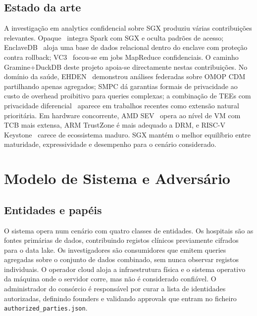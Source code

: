 \subsection{Estado da arte}

A investigação em analytics confidencial sobre SGX produziu várias contribuições relevantes. Opaque~\cite{zheng2017opaque} integra Spark com SGX e oculta padrões de acesso; EnclaveDB~\cite{priebe2018enclavedb} aloja uma base de dados relacional dentro do enclave com proteção contra rollback; VC3~\cite{schuster2015vc3} focou-se em jobs MapReduce confidenciais. O caminho Gramine+DuckDB deste projeto apoia-se directamente nestas contribuições. No domínio da saúde, EHDEN~\cite{ehden} demonstrou análises federadas sobre OMOP CDM partilhando apenas agregados; SMPC dá garantias formais de privacidade ao custo de overhead proibitivo para queries complexas; a combinação de TEEs com privacidade diferencial~\cite{dwork2006differential} aparece em trabalhos recentes como extensão natural prioritária. Em hardware concorrente, AMD SEV~\cite{kaplan2016sev} opera ao nível de VM com TCB mais extensa, ARM TrustZone é mais adequado a DRM, e RISC-V Keystone~\cite{lee2020keystone} carece de ecossistema maduro. SGX mantém o melhor equilíbrio entre maturidade, expressividade e desempenho para o cenário considerado.

\section{Modelo de Sistema e Adversário}

\subsection{Entidades e papéis}

O sistema opera num cenário com quatro classes de entidades. Os hospitais são as fontes primárias de dados, contribuindo registos clínicos previamente cifrados para o data lake. Os investigadores são consumidores que emitem queries agregadas sobre o conjunto de dados combinado, sem nunca observar registos individuais. O operador cloud aloja a infraestrutura física e o sistema operativo da máquina onde o servidor corre, mas não é considerado confiável. O administrador do consórcio é responsável por curar a lista de identidades autorizadas, definindo founders e validando approvals que entram no ficheiro \texttt{authorized\_parties.json}.

